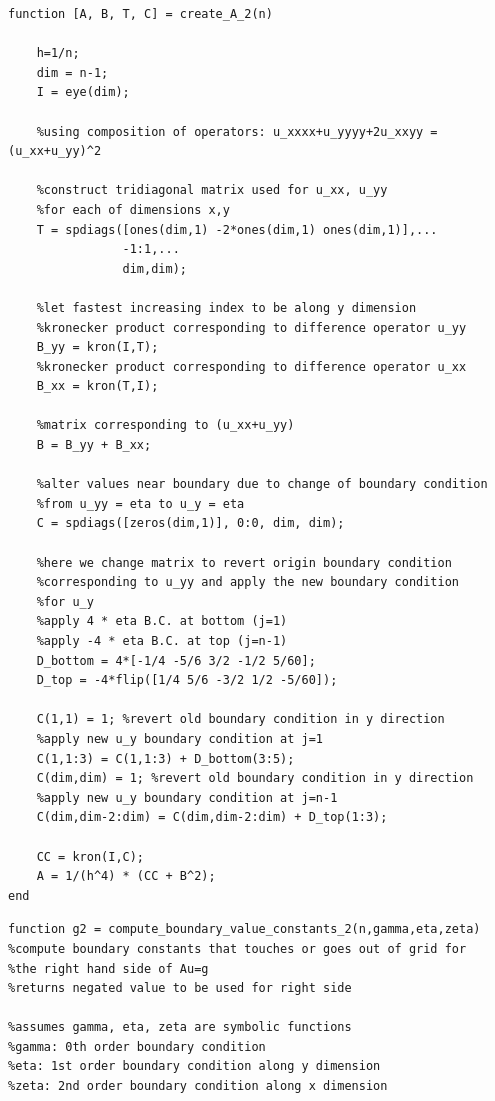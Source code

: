 \documentclass[12pt,letter]{article}
\begin{document}
\begin{enumerate}
\begin{enumerate}
\begin{verbatim}
function [A, B, T, C] = create_A_2(n)
    
    h=1/n;
    dim = n-1;
    I = eye(dim);

    %using composition of operators: u_xxxx+u_yyyy+2u_xxyy = (u_xx+u_yy)^2

    %construct tridiagonal matrix used for u_xx, u_yy
    %for each of dimensions x,y
    T = spdiags([ones(dim,1) -2*ones(dim,1) ones(dim,1)],...
                -1:1,...
                dim,dim);

    %let fastest increasing index to be along y dimension
    %kronecker product corresponding to difference operator u_yy
    B_yy = kron(I,T);
    %kronecker product corresponding to difference operator u_xx
    B_xx = kron(T,I);

    %matrix corresponding to (u_xx+u_yy)
    B = B_yy + B_xx;
    
    %alter values near boundary due to change of boundary condition
    %from u_yy = eta to u_y = eta
    C = spdiags([zeros(dim,1)], 0:0, dim, dim);

    %here we change matrix to revert origin boundary condition
    %corresponding to u_yy and apply the new boundary condition 
    %for u_y
    %apply 4 * eta B.C. at bottom (j=1)
    %apply -4 * eta B.C. at top (j=n-1)
    D_bottom = 4*[-1/4 -5/6 3/2 -1/2 5/60];
    D_top = -4*flip([1/4 5/6 -3/2 1/2 -5/60]);
    
    C(1,1) = 1; %revert old boundary condition in y direction
    %apply new u_y boundary condition at j=1
    C(1,1:3) = C(1,1:3) + D_bottom(3:5);
    C(dim,dim) = 1; %revert old boundary condition in y direction
    %apply new u_y boundary condition at j=n-1
    C(dim,dim-2:dim) = C(dim,dim-2:dim) + D_top(1:3);

    CC = kron(I,C);
    A = 1/(h^4) * (CC + B^2);
end
\end{verbatim}

\pagebreak

\begin{verbatim}
function g2 = compute_boundary_value_constants_2(n,gamma,eta,zeta)
%compute boundary constants that touches or goes out of grid for
%the right hand side of Au=g
%returns negated value to be used for right side

%assumes gamma, eta, zeta are symbolic functions
%gamma: 0th order boundary condition
%eta: 1st order boundary condition along y dimension
%zeta: 2nd order boundary condition along x dimension


\end{verbatim}
\end{enumerate}
\end{enumerate}
\end{document}
